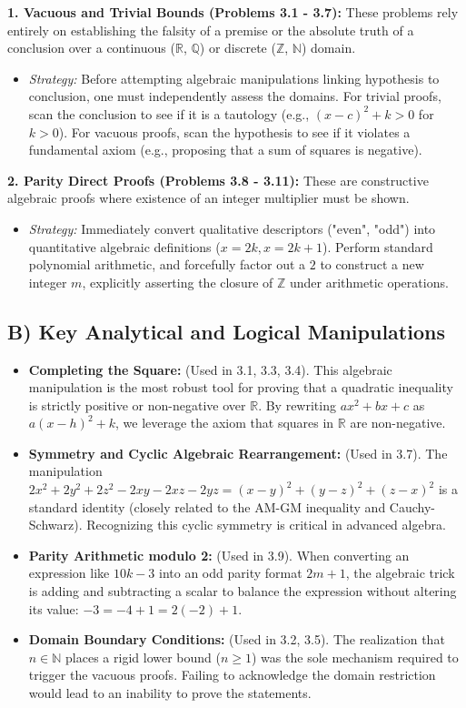 \documentclass[11pt]{article}
\theoremstyle{remark}
\begin{document}
\textbf{1. Vacuous and Trivial Bounds (Problems 3.1 - 3.7):} 
These problems rely entirely on establishing the falsity of a premise or the absolute truth of a conclusion over a continuous ($\mathbb{R}$, $\mathbb{Q}$) or discrete ($\mathbb{Z}$, $\mathbb{N}$) domain.
\begin{itemize}
    \item \textit{Strategy:} Before attempting algebraic manipulations linking hypothesis to conclusion, one must independently assess the domains. For trivial proofs, scan the conclusion to see if it is a tautology (e.g., $(x-c)^2 + k > 0$ for $k>0$). For vacuous proofs, scan the hypothesis to see if it violates a fundamental axiom (e.g., proposing that a sum of squares is negative).
\end{itemize}

\textbf{2. Parity Direct Proofs (Problems 3.8 - 3.11):}
These are constructive algebraic proofs where existence of an integer multiplier must be shown.
\begin{itemize}
    \item \textit{Strategy:} Immediately convert qualitative descriptors ("even", "odd") into quantitative algebraic definitions ($x = 2k, x = 2k+1$). Perform standard polynomial arithmetic, and forcefully factor out a $2$ to construct a new integer $m$, explicitly asserting the closure of $\mathbb{Z}$ under arithmetic operations.
\end{itemize}

\subsection{B) Key Analytical and Logical Manipulations}
\begin{itemize}
    \item \textbf{Completing the Square:} (Used in 3.1, 3.3, 3.4). This algebraic manipulation is the most robust tool for proving that a quadratic inequality is strictly positive or non-negative over $\mathbb{R}$. By rewriting $ax^2 + bx + c$ as $a(x-h)^2 + k$, we leverage the axiom that squares in $\mathbb{R}$ are non-negative.
    \item \textbf{Symmetry and Cyclic Algebraic Rearrangement:} (Used in 3.7). The manipulation $2x^2 + 2y^2 + 2z^2 - 2xy - 2xz - 2yz = (x-y)^2 + (y-z)^2 + (z-x)^2$ is a standard identity (closely related to the AM-GM inequality and Cauchy-Schwarz). Recognizing this cyclic symmetry is critical in advanced algebra.
    \item \textbf{Parity Arithmetic modulo 2:} (Used in 3.9). When converting an expression like $10k - 3$ into an odd parity format $2m + 1$, the algebraic trick is adding and subtracting a scalar to balance the expression without altering its value: $-3 = -4 + 1 = 2(-2) + 1$. 
    \item \textbf{Domain Boundary Conditions:} (Used in 3.2, 3.5). The realization that $n \in \mathbb{N}$ places a rigid lower bound ($n \ge 1$) was the sole mechanism required to trigger the vacuous proofs. Failing to acknowledge the domain restriction would lead to an inability to prove the statements.
\end{itemize}
\end{document}
